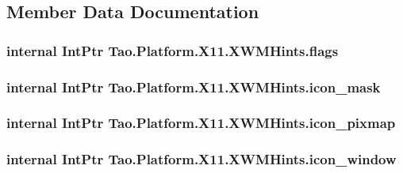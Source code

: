 \subsection{Member Data Documentation}
\hypertarget{struct_tao_1_1_platform_1_1_x11_1_1_x_w_m_hints_a7ab2f00af67ddc934a45ad492d049ae4}{
\subsubsection[{flags}]{\setlength{\rightskip}{0pt plus 5cm}internal IntPtr {\bf Tao.Platform.X11.XWMHints.flags}}}
\label{struct_tao_1_1_platform_1_1_x11_1_1_x_w_m_hints_a7ab2f00af67ddc934a45ad492d049ae4}
\hypertarget{struct_tao_1_1_platform_1_1_x11_1_1_x_w_m_hints_a623047a93d81311d7c7fd61b18937c9f}{
\subsubsection[{icon\_\-mask}]{\setlength{\rightskip}{0pt plus 5cm}internal IntPtr {\bf Tao.Platform.X11.XWMHints.icon\_\-mask}}}
\label{struct_tao_1_1_platform_1_1_x11_1_1_x_w_m_hints_a623047a93d81311d7c7fd61b18937c9f}
\hypertarget{struct_tao_1_1_platform_1_1_x11_1_1_x_w_m_hints_a988cf463103d329b07367398e8112118}{
\subsubsection[{icon\_\-pixmap}]{\setlength{\rightskip}{0pt plus 5cm}internal IntPtr {\bf Tao.Platform.X11.XWMHints.icon\_\-pixmap}}}
\label{struct_tao_1_1_platform_1_1_x11_1_1_x_w_m_hints_a988cf463103d329b07367398e8112118}
\hypertarget{struct_tao_1_1_platform_1_1_x11_1_1_x_w_m_hints_ab78d9e8bc6658270fe5ad78c2e587c5d}{
\subsubsection[{icon\_\-window}]{\setlength{\rightskip}{0pt plus 5cm}internal IntPtr {\bf Tao.Platform.X11.XWMHints.icon\_\-window}}}
